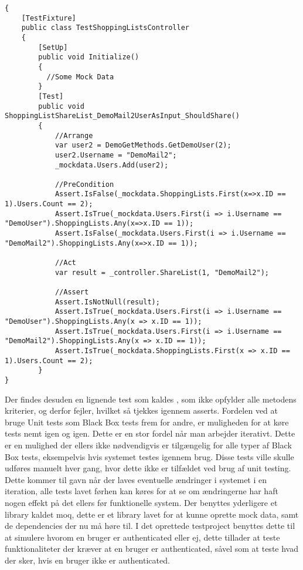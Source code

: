 \begin{lstlisting}[caption={Test for metoden \class{ShareList}.}, label=lsttest]
{
    [TestFixture]
    public class TestShoppingListsController
    {
    	[SetUp]
        public void Initialize()
        {
          //Some Mock Data
        }
        [Test]
        public void ShoppingListShareList_DemoMail2UserAsInput_ShouldShare()
        {
            //Arrange
            var user2 = DemoGetMethods.GetDemoUser(2);
            user2.Username = "DemoMail2";
            _mockdata.Users.Add(user2); 

            //PreCondition
            Assert.IsFalse(_mockdata.ShoppingLists.First(x=>x.ID == 1).Users.Count == 2);
            Assert.IsTrue(_mockdata.Users.First(i => i.Username == "DemoUser").ShoppingLists.Any(x=>x.ID == 1));
            Assert.IsFalse(_mockdata.Users.First(i => i.Username == "DemoMail2").ShoppingLists.Any(x=>x.ID == 1));

            //Act
            var result = _controller.ShareList(1, "DemoMail2");

            //Assert
            Assert.IsNotNull(result);
            Assert.IsTrue(_mockdata.Users.First(i => i.Username == "DemoUser").ShoppingLists.Any(x => x.ID == 1));
            Assert.IsTrue(_mockdata.Users.First(i => i.Username == "DemoMail2").ShoppingLists.Any(x => x.ID == 1));
            Assert.IsTrue(_mockdata.ShoppingLists.First(x => x.ID == 1).Users.Count == 2);
        }
}        
\end{lstlisting}
Der findes desuden en lignende test som kaldes , som ikke opfylder alle metodens kriterier, og derfor fejler, hvilket så tjekkes igennem asserts.
Fordelen ved at bruge Unit tests som Black Box tests frem for andre, er muligheden for at køre tests nemt igen og igen.
Dette er en stor fordel når man arbejder iterativt.
Dette er en mulighed der ellers ikke nødvendigvis er tilgængelig for alle typer af Black Box tests, eksempelvis hvis systemet testes igennem brug.
Disse tests ville skulle udføres manuelt hver gang, hvor dette ikke er tilfældet ved brug af unit testing.
Dette kommer til gavn når der laves eventuelle ændringer i systemet i en iteration, alle tests lavet førhen kan køres for at se om ændringerne har haft nogen effekt på det ellers før funktionelle system. 
Der benyttes yderligere et library kaldet moq, dette er et library lavet for at kunne oprette mock data, samt de dependencies der nu må høre til.
I det oprettede testproject benyttes dette til at simulere hvorom en bruger er authenticated eller ej, dette tillader at teste funktionaliteter der kræver at en bruger er authenticated, såvel som at teste hvad der sker, hvis en bruger ikke er authenticated.


